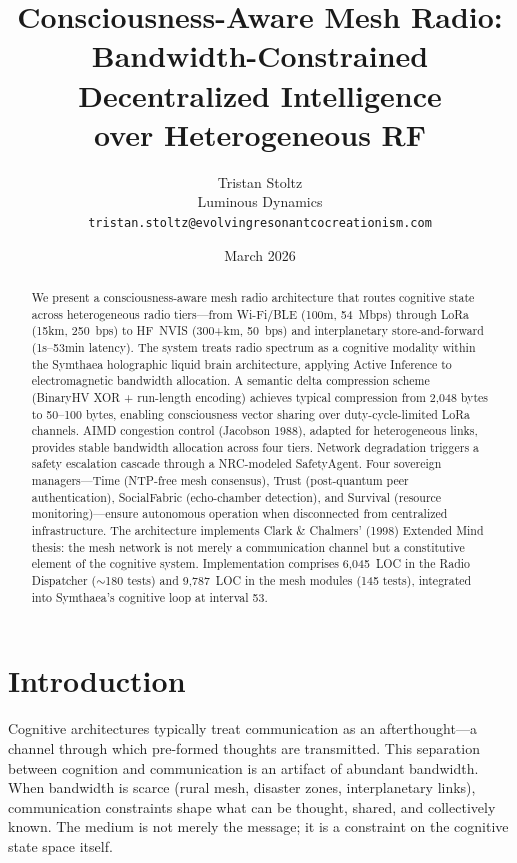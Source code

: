 \documentclass[11pt,twocolumn]{article}
\title{\textbf{Consciousness-Aware Mesh Radio:} \\
Bandwidth-Constrained Decentralized Intelligence \\
over Heterogeneous RF}
\author{Tristan Stoltz \\ Luminous Dynamics \\
\texttt{tristan.stoltz@evolvingresonantcocreationism.com}}
\date{March 2026}
\begin{document}
\maketitle

\begin{abstract}
We present a consciousness-aware mesh radio architecture that routes cognitive
state across heterogeneous radio tiers---from Wi-Fi/BLE (100m, 54~Mbps) through
LoRa (15km, 250~bps) to HF~NVIS (300+km, 50~bps) and interplanetary
store-and-forward (1s--53min latency). The system treats radio spectrum as a
cognitive modality within the Symthaea holographic liquid brain architecture,
applying Active Inference to electromagnetic bandwidth allocation. A semantic
delta compression scheme (BinaryHV XOR + run-length encoding) achieves typical
compression from 2,048 bytes to 50--100 bytes, enabling consciousness vector
sharing over duty-cycle-limited LoRa channels. AIMD congestion control (Jacobson
1988), adapted for heterogeneous links, provides stable bandwidth allocation
across four tiers. Network degradation triggers a safety escalation cascade
through a NRC-modeled SafetyAgent. Four sovereign managers---Time (NTP-free
mesh consensus), Trust (post-quantum peer authentication), SocialFabric
(echo-chamber detection), and Survival (resource monitoring)---ensure autonomous
operation when disconnected from centralized infrastructure. The architecture
implements Clark \& Chalmers' (1998) Extended Mind thesis: the mesh network is
not merely a communication channel but a constitutive element of the cognitive
system. Implementation comprises 6,045~LOC in the Radio Dispatcher ($\sim$180
tests) and 9,787~LOC in the mesh modules (145 tests), integrated into Symthaea's
cognitive loop at interval 53.
\end{abstract}

\section{Introduction}

Cognitive architectures typically treat communication as an afterthought---a
channel through which pre-formed thoughts are transmitted. This separation
between cognition and communication is an artifact of abundant bandwidth.
When bandwidth is scarce (rural mesh, disaster zones, interplanetary links),
communication constraints shape what can be thought, shared, and collectively
known. The medium is not merely the message; it is a constraint on the
cognitive state space itself.
\end{document}
